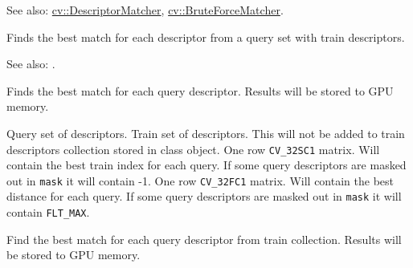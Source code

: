 See also: \hyperref[cv.class.DescriptorMatcher]{cv::DescriptorMatcher}, \hyperref[cv.class.BruteForceMatcher]{cv::BruteForceMatcher}.


\label{cppfunc.gpu.BruteForceMatcher.match}
Finds the best match for each descriptor from a query set with train descriptors.


See also: .


\label{cppfunc.gpu.BruteForceMatcher.matchSingle}
Finds the best match for each query descriptor. Results will be stored to GPU memory.


\begin{description}
 {Query set of descriptors.}
 {Train set of descriptors. This will not be added to train descriptors collection stored in class object.}
 {One row \texttt{CV\_32SC1} matrix. Will contain the best train index for each query. If some query descriptors are masked out in \texttt{mask} it will contain -1.}
 {One row \texttt{CV\_32FC1} matrix. Will contain the best distance for each query. If some query descriptors are masked out in \texttt{mask} it will contain \texttt{FLT\_MAX}.}
\end{description}


\label{cppfunc.gpu.BruteForceMatcher.matchCollection}
Find the best match for each query descriptor from train collection. Results will be stored to GPU memory.

